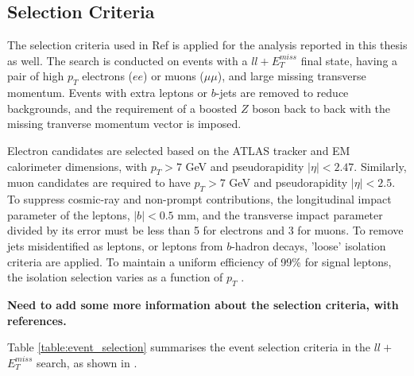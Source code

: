 \documentclass[11pt,a4paper,openright,twoside]{report}
\newcommand{\met}{$E_T^{miss}$ }
\begin{document}
\subsection{Selection Criteria}
The selection criteria used in Ref \cite{ZH_ATLAS} is applied for the analysis reported in this thesis as well. The search is conducted on events with a $ll+$\met final state, having a pair of high $p_T$ electrons ($ee$) or muons ($\mu\mu$), and large missing transverse momentum. Events with extra leptons or $b$-jets are removed to reduce backgrounds, and the requirement of a boosted $Z$ boson back to back with the missing tranverse momentum vector is imposed.

Electron candidates are selected based on the ATLAS tracker and EM calorimeter dimensions, with $p_T > 7$ GeV and pseudorapidity $|\eta| < 2.47$. Similarly, muon candidates are required to have $p_T > 7$ GeV and pseudorapidity $|\eta| < 2.5$. 
To suppress cosmic-ray and non-prompt contributions, the longitudinal impact parameter of the leptons, $|b|<0.5$ mm, and the transverse impact parameter divided by its error must be less than 5 for electrons and 3 for muons. To remove jets misidentified as leptons, or leptons from $b$-hadron decays, 'loose' isolation criteria \cite{loose1,loose2} are applied. To maintain a uniform efficiency of 99\% for signal leptons, the isolation selection varies as a function of $p_T$ .


\textbf{Need to add some more information about the selection criteria, with references.}

Table \ref{table:event_selection} summarises the event selection criteria in the $ll+$\met search, as shown in \cite{ZH_ATLAS}.
\end{document}
